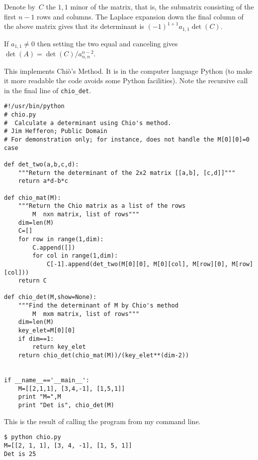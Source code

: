 \begin{exercises}
\begin{answer}
      Denote by~$C$ the $1,1$ minor of the matrix,
      that is, the submatrix consisting of the first $n-1$ rows and columns.
      The Laplace expansion down the final column of the above matrix  
      gives that its determinant is $(-1)^{1+1}a_{1,1}\det(C)$.

      If $a_{1,1}\neq 0$ then setting the two equal and 
      canceling gives $\det(A)=\det(C)/a_{n,n}^{n-2}$.       
    \end{answer}
\end{exercises}

\announcecomputercode
This implements Chi\`o's Method.
It is in the computer language Python (to make it more readable 
the code avoids some Python facilities).
Note the recursive call in the final line of 
\lstinline!chio_det!. 
\begin{lstlisting}
#!/usr/bin/python
# chio.py
#  Calculate a determinant using Chio's method.
# Jim Hefferon; Public Domain
# For demonstration only; for instance, does not handle the M[0][0]=0 case

def det_two(a,b,c,d):
    """Return the determinant of the 2x2 matrix [[a,b], [c,d]]"""
    return a*d-b*c

def chio_mat(M):
    """Return the Chio matrix as a list of the rows
        M  nxn matrix, list of rows"""
    dim=len(M)
    C=[]
    for row in range(1,dim):
        C.append([])
        for col in range(1,dim):  
            C[-1].append(det_two(M[0][0], M[0][col], M[row][0], M[row][col]))
    return C

def chio_det(M,show=None):
    """Find the determinant of M by Chio's method
        M  mxm matrix, list of rows"""
    dim=len(M)
    key_elet=M[0][0]
    if dim==1:
        return key_elet
    return chio_det(chio_mat(M))/(key_elet**(dim-2))


if __name__=='__main__':
    M=[[2,1,1], [3,4,-1], [1,5,1]]
    print "M=",M
    print "Det is", chio_det(M)
\end{lstlisting}
This is the result of calling the program from my command line.
\begin{lstlisting}
$ python chio.py
M=[[2, 1, 1], [3, 4, -1], [1, 5, 1]]
Det is 25
\end{lstlisting}
\endinput
